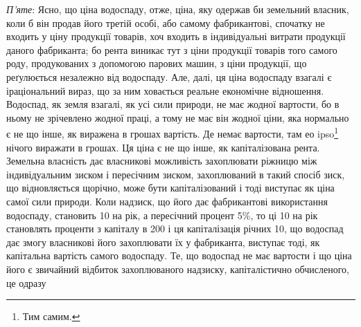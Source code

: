 \emph{П’яте}: Ясно, що ціна водоспаду, отже, ціна, яку одержав би земельний
власник, коли б він продав його третій особі, або самому фабрикантові,
спочатку не входить у ціну продукції товарів, хоч входить в індивідуальні
витрати продукції даного фабриканта; бо рента виникає тут з ціни продукції
товарів того самого роду, продукованих з допомогою парових машин,
з ціни продукції, що реґулюється незалежно від водоспаду. Але, далі, ця ціна
водоспаду взагалі є іраціональний вираз, що за ним ховається реальне економічне
відношення. Водоспад, як земля взагалі, як усі сили природи, не має
жодної вартости, бо в ньому не зрічевлено жодної праці, а тому не має він
жодної ціни, яка нормально є не що інше, як виражена в грошах вартість.
Де немає вартости, там ео ipso\footnote*{
Тим самим. 
} нічого виражати в грошах. Ця ціна є не
що інше, як капіталізована рента. Земельна власність дає власникові можливість
захоплювати ріжницю між індивідуальним зиском і пересічним зиском,
захоплюваний в такий спосіб зиск, що відновляється щорічно, може бути капіталізований
і тоді виступає як ціна самої сили природи. Коли надзиск, що
його дає фабрикантові використання водоспаду, становить 10 на рік, а
пересічний процент 5\%, то ці 10 на рік становлять проценти з капіталу в
200 і ця капіталізація річних 10, що водоспад дає змогу власникові
його захоплювати їх у фабриканта, виступає тоді, як капітальна вартість самого
водоспаду. Те, що водоспад не має вартости і що ціна його є звичайний
відбиток захоплюваного надзиску, капіталістично обчисленого, це одразу
\parbreak{}  %
